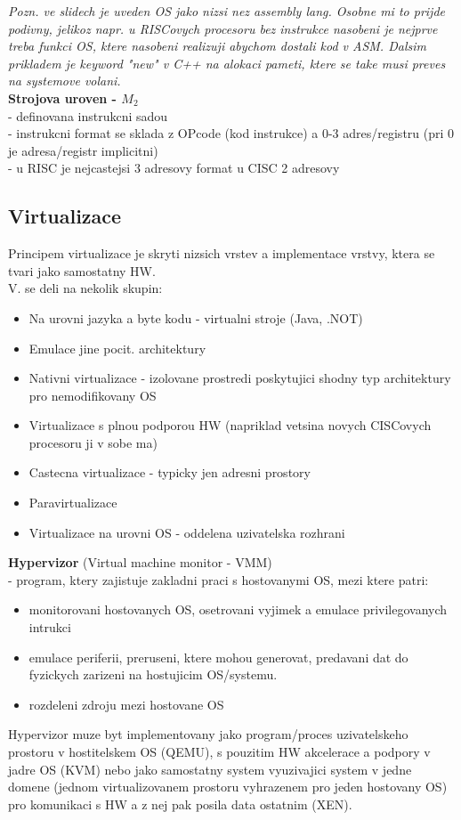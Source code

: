 \documentclass[10pt]{article}
\begin{document}
\textit{Pozn. ve slidech je uveden OS jako nizsi nez assembly lang. Osobne mi to prijde podivny, jelikoz napr. u RISCovych procesoru bez instrukce nasobeni je nejprve treba funkci OS, ktere nasobeni realizuji abychom dostali kod v ASM. Dalsim prikladem je keyword "new" v C++ na alokaci pameti, ktere se take musi preves na systemove volani.}\\

\textbf{Strojova uroven - $M_2$}\\
- definovana instrukcni sadou\\
- instrukcni format se sklada z OPcode (kod instrukce) a 0-3 adres/registru (pri 0 je adresa/registr implicitni)\\
- u RISC je nejcastejsi 3 adresovy format u CISC 2 adresovy\\

\subsection*{Virtualizace}
Principem virtualizace je skryti nizsich vrstev a implementace vrstvy, ktera se tvari jako samostatny HW.\\

\newpage
V. se deli na nekolik skupin:
\begin{itemize}
\item Na urovni jazyka a byte kodu - virtualni stroje (Java, .NOT)
\item Emulace jine pocit. architektury
\item Nativni virtualizace - izolovane prostredi poskytujici shodny typ
architektury pro nemodifikovany OS
\item Virtualizace s plnou podporou HW (napriklad vetsina novych CISCovych procesoru ji v sobe ma)
\item Castecna virtualizace - typicky jen adresni prostory
\item Paravirtualizace
\item Virtualizace na urovni OS - oddelena uzivatelska rozhrani
\end{itemize}

\textbf{Hypervizor} (Virtual machine monitor - VMM)\\
- program, ktery zajistuje zakladni praci s hostovanymi OS, mezi ktere patri:
\begin{itemize}
\item monitorovani hostovanych OS, osetrovani vyjimek a emulace privilegovanych intrukci
\item emulace periferii, preruseni, ktere mohou generovat, predavani dat do fyzickych zarizeni na hostujicim OS/systemu.
\item rozdeleni zdroju mezi hostovane OS
\end{itemize}
Hypervizor muze byt implementovany jako program/proces uzivatelskeho prostoru v hostitelskem OS (QEMU), s pouzitim HW akcelerace a podpory v jadre OS (KVM) nebo jako samostatny system vyuzivajici system v jedne domene (jednom virtualizovanem prostoru vyhrazenem pro jeden hostovany OS) pro komunikaci s HW a z nej pak posila data ostatnim (XEN).\\
\end{document}
